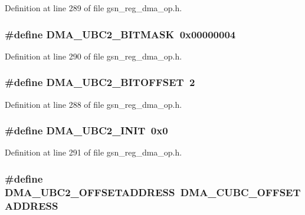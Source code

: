 Definition at line 289 of file gsn\_\-reg\_\-dma\_\-op.h.

\hypertarget{a00547_aac5bcaab524998e45b1a9c6518a4dfdc}{
\subsubsection[{DMA\_\-UBC2\_\-BITMASK}]{\setlength{\rightskip}{0pt plus 5cm}\#define DMA\_\-UBC2\_\-BITMASK~0x00000004}}
\label{a00547_aac5bcaab524998e45b1a9c6518a4dfdc}


Definition at line 290 of file gsn\_\-reg\_\-dma\_\-op.h.

\hypertarget{a00547_ada4233f031183ef63d59438052f3b7b9}{
\subsubsection[{DMA\_\-UBC2\_\-BITOFFSET}]{\setlength{\rightskip}{0pt plus 5cm}\#define DMA\_\-UBC2\_\-BITOFFSET~2}}
\label{a00547_ada4233f031183ef63d59438052f3b7b9}


Definition at line 288 of file gsn\_\-reg\_\-dma\_\-op.h.

\hypertarget{a00547_a5c433d5388778bd7d73919f800246aa8}{
\subsubsection[{DMA\_\-UBC2\_\-INIT}]{\setlength{\rightskip}{0pt plus 5cm}\#define DMA\_\-UBC2\_\-INIT~0x0}}
\label{a00547_a5c433d5388778bd7d73919f800246aa8}


Definition at line 291 of file gsn\_\-reg\_\-dma\_\-op.h.

\hypertarget{a00547_a4cbc6b413253fd99a49bf340dd1840d7}{
\subsubsection[{DMA\_\-UBC2\_\-OFFSETADDRESS}]{\setlength{\rightskip}{0pt plus 5cm}\#define DMA\_\-UBC2\_\-OFFSETADDRESS~DMA\_\-CUBC\_\-OFFSETADDRESS}}
\label{a00547_a4cbc6b413253fd99a49bf340dd1840d7}


